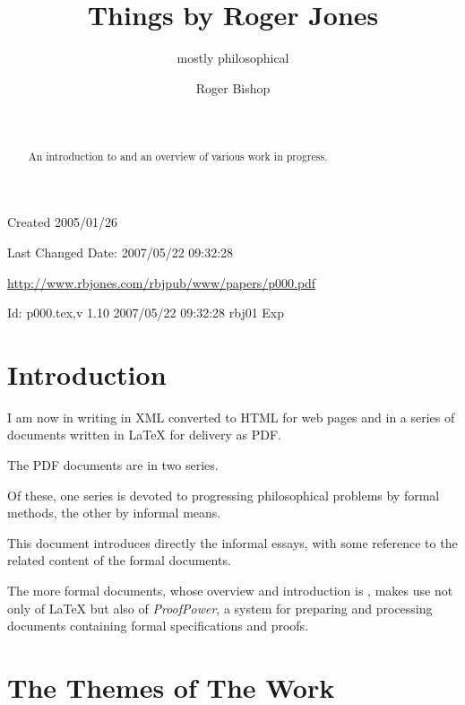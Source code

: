 \documentclass[numreferences]{rbjk}
\begin{document}
                                                                                   
\begin{article}
\begin{opening}  
\title{Things by Roger Jones}
\subtitle{mostly philosophical}
\author{Roger Bishop }
\date{\ }

\begin{abstract}
An introduction to and an overview of various work in progress.
\end{abstract}
\end{opening}

\vfill

\begin{centering}
{\footnotesize
Created 2005/01/26

Last Changed $ $Date: 2007/05/22 09:32:28 $ $

\href{http://www.rbjones.com/rbjpub/www/papers/p000.pdf}
{http://www.rbjones.com/rbjpub/www/papers/p000.pdf}

$ $Id: p000.tex,v 1.10 2007/05/22 09:32:28 rbj01 Exp $ $

}%
\end{centering}

\newpage

\setcounter{tocdepth}{4}
{\parskip=0pt\tableofcontents}

\section{Introduction}

I am now in writing in XML converted to HTML for web pages and in a
series of documents written in LaTeX for delivery as PDF.

The PDF documents are in two series.

Of these, one series is devoted to progressing philosophical problems
by formal methods, the other by informal means.

This document introduces directly the informal essays, with some
reference to the related content of the formal documents.

The more formal documents, whose overview and introduction is \cite{rbjt000}, makes use not only of {\LaTeX} but also of {\it ProofPower}, a system for preparing and processing documents containing formal specifications and proofs.

\section{The Themes of The Work}


\end{article}
\end{document}
